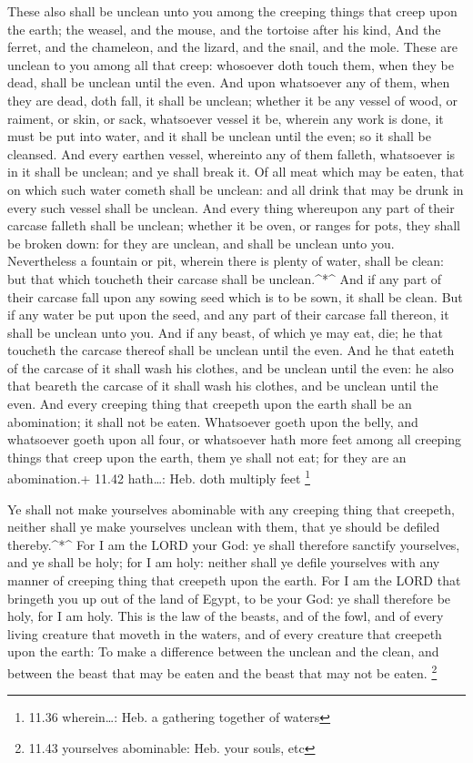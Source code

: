  These also shall be unclean unto you among the creeping
things that creep upon the earth; the weasel, and the mouse, and the
tortoise after his kind,  And the ferret, and the
chameleon, and the lizard, and the snail, and the mole. 
These are unclean to you among all that creep: whosoever doth touch
them, when they be dead, shall be unclean until the even. 
And upon whatsoever any of them, when they are dead, doth fall, it shall
be unclean; whether it be any vessel of wood, or raiment, or skin, or
sack, whatsoever vessel it be, wherein any work is done, it must be put
into water, and it shall be unclean until the even; so it shall be
cleansed.  And every earthen vessel, whereinto any of them
falleth, whatsoever is in it shall be unclean; and ye shall break it.
 Of all meat which may be eaten, that on which such water
cometh shall be unclean: and all drink that may be drunk in every such
vessel shall be unclean.  And every thing whereupon any
part of their carcase falleth shall be unclean; whether it be oven, or
ranges for pots, they shall be broken down: for they are unclean, and
shall be unclean unto you.  Nevertheless a fountain or pit,
wherein there is plenty of water, shall be clean: but that which
toucheth their carcase shall be unclean.\^{}*\^{}  And if
any part of their carcase fall upon any sowing seed which is to be sown,
it shall be clean.  But if any water be put upon the seed,
and any part of their carcase fall thereon, it shall be unclean unto
you.  And if any beast, of which ye may eat, die; he that
toucheth the carcase thereof shall be unclean until the even.
 And he that eateth of the carcase of it shall wash his
clothes, and be unclean until the even: he also that beareth the carcase
of it shall wash his clothes, and be unclean until the even.
 And every creeping thing that creepeth upon the earth
shall be an abomination; it shall not be eaten.  Whatsoever
goeth upon the belly, and whatsoever goeth upon all four, or whatsoever
hath more feet among all creeping things that creep upon the earth, them
ye shall not eat; for they are an abomination.+ 11.42 hath\ldots: Heb.
doth multiply feet \footnote{11.36 wherein\ldots: Heb. a gathering
  together of waters}

 Ye shall not make yourselves abominable with any creeping
thing that creepeth, neither shall ye make yourselves unclean with them,
that ye should be defiled thereby.\^{}*\^{}  For I am the
LORD your God: ye shall therefore sanctify yourselves, and ye shall be
holy; for I am holy: neither shall ye defile yourselves with any manner
of creeping thing that creepeth upon the earth.  For I am
the LORD that bringeth you up out of the land of Egypt, to be your God:
ye shall therefore be holy, for I am holy.  This is the law
of the beasts, and of the fowl, and of every living creature that moveth
in the waters, and of every creature that creepeth upon the earth:
 To make a difference between the unclean and the clean,
and between the beast that may be eaten and the beast that may not be
eaten. \footnote{11.43 yourselves abominable: Heb. your souls, etc}

